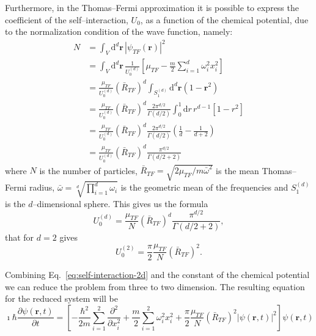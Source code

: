Furthermore, in the Thomas--Fermi approximation it is possible to express the coefficient of the self--interaction, $U_0$, as a function of the chemical potential, due to the normalization condition of the wave function, namely:
\begin{equation}
\begin{split}
N & = \int_V \mathrm{d}^d \textbf{r} \, |\psi_{TF}(\textbf{r})|^2 \\
& = \int_V \mathrm{d}^d \textbf{r} \, \frac{1}{U_0^{(d)}} \left[ \mu_{TF} - \frac{m}{2} \sum_{i=1}^d \omega_i^2 x_i^2 \right] \\
& = \frac{\mu_{TF}}{U_0^{(d)}} \left( \bar{R}_{TF} \right)^d \int_{S_1^{(d)}} \mathrm{d}^d \textbf{r} (1 - \textbf{r}^2) \\ 
& = \frac{\mu_{TF}}{U_0^{(d)}} \left( \bar{R}_{TF} \right)^d \frac{2\pi^{d/2}}{\Gamma(d/2)} \int_0^1 \mathrm{d}r \, r^{d-1} [1 - r^2] \\
& = \frac{\mu_{TF}}{U_0^{(d)}} \left( \bar{R}_{TF} \right)^d \frac{2\pi^{d/2}}{\Gamma(d/2)} \left( \frac{1}{d} - \frac{1}{d+2} \right) \\
& = \frac{\mu_{TF}}{U_0^{(d)}} \left( \bar{R}_{TF} \right)^d \frac{\pi^{d/2}}{\Gamma(d/2 + 2)}
\end{split}
\end{equation}
where $N$ is the number of particles, $\bar{R}_{TF} = \sqrt{2\mu_{TF} / m \bar{\omega}^2}$ is the mean Thomas--Fermi radius, $\bar{\omega} = \sqrt[d]{\prod_{i=1}^d \omega_i}$ is the geometric mean of the frequencies and $S_1^{(d)}$ is the $d$--dimensional sphere.
This gives us the formula
\begin{equation}
U_0^{(d)} = \frac{\mu_{TF}}{N} \left( \bar{R}_{TF} \right)^d \frac{\pi^{d/2}}{\Gamma(d/2 + 2)},
\end{equation}
that for $d=2$ gives
\begin{equation} \label{eq:self-interaction-2d}
U_0^{(2)} = \frac{\pi}{2} \frac{\mu_{TF}}{N} \left( \bar{R}_{TF} \right)^2.
\end{equation}

Combining Eq.~\eqref{eq:self-interaction-2d} and the constant of the chemical potential we can reduce the problem from three to two dimension. The resulting equation for the reduced system will be
\begin{equation}
\imath \hbar \frac{\partial \psi(\textbf{r}, t)}{\partial t} = \left[ - \frac{\hbar^2}{2m} \sum_{i=1}^2 \frac{\partial^2}{\partial x_i^2} + \frac{m}{2} \sum_{i=1}^2 \omega_i^2 x_i^2 + \frac{\pi}{2} \frac{\mu_{TF}}{N} \left( \bar{R}_{TF} \right)^2 |\psi(\textbf{r}, t)|^2 \right] \psi(\textbf{r}, t) \nonumber
\end{equation}
